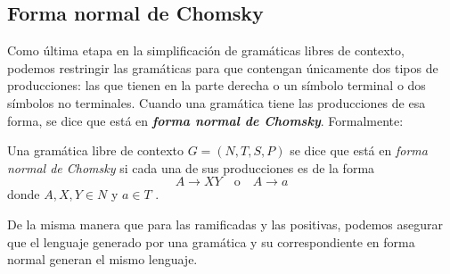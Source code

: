 \subsection{Forma normal de Chomsky}

Como última etapa en la simplificación de gramáticas libres de contexto, podemos restringir las gramáticas para que
contengan únicamente dos tipos de producciones: las que tienen en la parte derecha o un símbolo terminal o dos símbolos
no terminales. Cuando una gramática tiene las producciones de esa forma, se dice que está en 
\textbf{\textit{forma normal de Chomsky}}. Formalmente:

\begin{definicion}Una gramática libre de contexto $G=(N,T,S,P)$ se dice que está en \textit{forma normal de Chomsky} si
cada una de sus producciones es de la forma
\begin{equation}
    A\to XY \quad\text{o}\quad A\to a 
\end{equation}
donde $A,X,Y\in N$ y $a\in T$ \cite{davis_sigal_weyuker_1994}.
\end{definicion}

De la misma manera que para las ramificadas y las positivas, podemos asegurar que el lenguaje generado por una 
gramática y su correspondiente en forma normal generan el mismo lenguaje.

